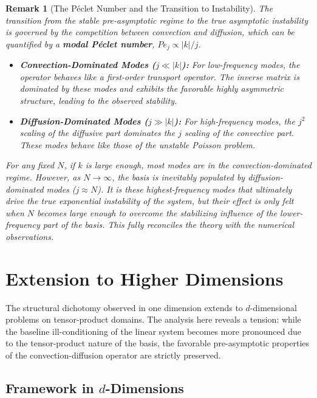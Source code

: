 \documentclass[pdflatex,sn-mathphys-num]{sn-jnl}%
\theoremstyle{thmstyleone}%
\newtheorem{remark}{Remark}
\begin{document}
\begin{remark}[The P\'eclet Number and the Transition to Instability]
The transition from the stable pre-asymptotic regime to the true asymptotic instability is governed by the competition between convection and diffusion, which can be quantified by a \textbf{modal P\'eclet number}, $Pe_j \propto |k|/j$.
\begin{itemize}
    \item \textbf{Convection-Dominated Modes ($j \ll |k|$):} For low-frequency modes, the operator behaves like a first-order transport operator. The inverse matrix is dominated by these modes and exhibits the favorable highly asymmetric structure, leading to the observed stability.
    \item \textbf{Diffusion-Dominated Modes ($j \gg |k|$):} For high-frequency modes, the $j^2$ scaling of the diffusive part dominates the $j$ scaling of the convective part. These modes behave like those of the unstable Poisson problem.
\end{itemize}
For any fixed $N$, if $k$ is large enough, most modes are in the convection-dominated regime. However, as $N \to \infty$, the basis is inevitably populated by diffusion-dominated modes ($j \approx N$). It is these highest-frequency modes that ultimately drive the true exponential instability of the system, but their effect is only felt when $N$ becomes large enough to overcome the stabilizing influence of the lower-frequency part of the basis. This fully reconciles the theory with the numerical observations.
\end{remark}

\section{Extension to Higher Dimensions}

The structural dichotomy observed in one dimension extends to $d$-dimensional problems on tensor-product domains. The analysis here reveals a tension: while the baseline ill-conditioning of the linear system becomes more pronounced due to the tensor-product nature of the basis, the favorable pre-asymptotic properties of the convection-diffusion operator are strictly preserved.

\subsection{Framework in $d$-Dimensions}
\end{document}
